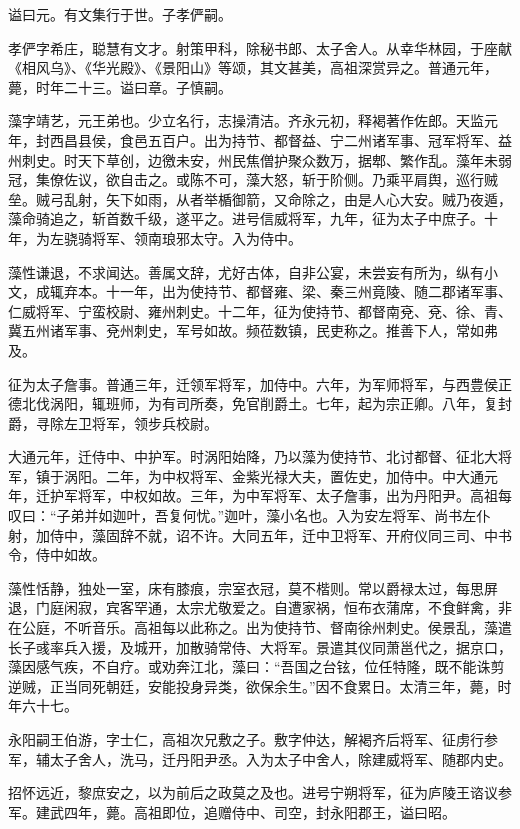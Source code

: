 \documentclass[12pt,UTF8]{ctexbook}
\begin{document}
谥曰元。有文集行于世。子孝俨嗣。

孝俨字希庄，聪慧有文才。射策甲科，除秘书郎、太子舍人。从幸华林园，于座献《相风乌》、《华光殿》、《景阳山》等颂，其文甚美，高祖深赏异之。普通元年，薨，时年二十三。谥曰章。子慎嗣。

藻字靖艺，元王弟也。少立名行，志操清洁。齐永元初，释褐著作佐郎。天监元年，封西昌县侯，食邑五百户。出为持节、都督益、宁二州诸军事、冠军将军、益州刺史。时天下草创，边徼未安，州民焦僧护聚众数万，据郫、繁作乱。藻年未弱冠，集僚佐议，欲自击之。或陈不可，藻大怒，斩于阶侧。乃乘平肩舆，巡行贼垒。贼弓乱射，矢下如雨，从者举楯御箭，又命除之，由是人心大安。贼乃夜遁，藻命骑追之，斩首数千级，遂平之。进号信威将军，九年，征为太子中庶子。十年，为左骁骑将军、领南琅邪太守。入为侍中。

藻性谦退，不求闻达。善属文辞，尤好古体，自非公宴，未尝妄有所为，纵有小文，成辄弃本。十一年，出为使持节、都督雍、梁、秦三州竟陵、随二郡诸军事、仁威将军、宁蛮校尉、雍州刺史。十二年，征为使持节、都督南兗、兗、徐、青、冀五州诸军事、兗州刺史，军号如故。频莅数镇，民吏称之。推善下人，常如弗及。

征为太子詹事。普通三年，迁领军将军，加侍中。六年，为军师将军，与西豊侯正德北伐涡阳，辄班师，为有司所奏，免官削爵土。七年，起为宗正卿。八年，复封爵，寻除左卫将军，领步兵校尉。

大通元年，迁侍中、中护军。时涡阳始降，乃以藻为使持节、北讨都督、征北大将军，镇于涡阳。二年，为中权将军、金紫光禄大夫，置佐史，加侍中。中大通元年，迁护军将军，中权如故。三年，为中军将军、太子詹事，出为丹阳尹。高祖每叹曰：“子弟并如迦叶，吾复何忧。”迦叶，藻小名也。入为安左将军、尚书左仆射，加侍中，藻固辞不就，诏不许。大同五年，迁中卫将军、开府仪同三司、中书令，侍中如故。

藻性恬静，独处一室，床有膝痕，宗室衣冠，莫不楷则。常以爵禄太过，每思屏退，门庭闲寂，宾客罕通，太宗尤敬爱之。自遭家祸，恒布衣蒲席，不食鲜禽，非在公庭，不听音乐。高祖每以此称之。出为使持节、督南徐州刺史。侯景乱，藻遣长子彧率兵入援，及城开，加散骑常侍、大将军。景遣其仪同萧邕代之，据京口，藻因感气疾，不自疗。或劝奔江北，藻曰：“吾国之台铉，位任特隆，既不能诛剪逆贼，正当同死朝廷，安能投身异类，欲保余生。”因不食累日。太清三年，薨，时年六十七。

永阳嗣王伯游，字士仁，高祖次兄敷之子。敷字仲达，解褐齐后将军、征虏行参军，辅太子舍人，洗马，迁丹阳尹丞。入为太子中舍人，除建威将军、随郡内史。

招怀远近，黎庶安之，以为前后之政莫之及也。进号宁朔将军，征为庐陵王谘议参军。建武四年，薨。高祖即位，追赠侍中、司空，封永阳郡王，谥曰昭。
\end{document}
